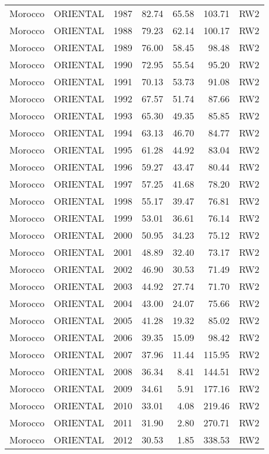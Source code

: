 \begin{longtable}{lllrrrl}
  Morocco & ORIENTAL & 1987 & 82.74 & 65.58 & 103.71 & RW2 \\ 
  Morocco & ORIENTAL & 1988 & 79.23 & 62.14 & 100.17 & RW2 \\ 
  Morocco & ORIENTAL & 1989 & 76.00 & 58.45 & 98.48 & RW2 \\ 
  Morocco & ORIENTAL & 1990 & 72.95 & 55.54 & 95.20 & RW2 \\ 
  Morocco & ORIENTAL & 1991 & 70.13 & 53.73 & 91.08 & RW2 \\ 
  Morocco & ORIENTAL & 1992 & 67.57 & 51.74 & 87.66 & RW2 \\ 
  Morocco & ORIENTAL & 1993 & 65.30 & 49.35 & 85.85 & RW2 \\ 
  Morocco & ORIENTAL & 1994 & 63.13 & 46.70 & 84.77 & RW2 \\ 
  Morocco & ORIENTAL & 1995 & 61.28 & 44.92 & 83.04 & RW2 \\ 
  Morocco & ORIENTAL & 1996 & 59.27 & 43.47 & 80.44 & RW2 \\ 
  Morocco & ORIENTAL & 1997 & 57.25 & 41.68 & 78.20 & RW2 \\ 
  Morocco & ORIENTAL & 1998 & 55.17 & 39.47 & 76.81 & RW2 \\ 
  Morocco & ORIENTAL & 1999 & 53.01 & 36.61 & 76.14 & RW2 \\ 
  Morocco & ORIENTAL & 2000 & 50.95 & 34.23 & 75.12 & RW2 \\ 
  Morocco & ORIENTAL & 2001 & 48.89 & 32.40 & 73.17 & RW2 \\ 
  Morocco & ORIENTAL & 2002 & 46.90 & 30.53 & 71.49 & RW2 \\ 
  Morocco & ORIENTAL & 2003 & 44.92 & 27.74 & 71.70 & RW2 \\ 
  Morocco & ORIENTAL & 2004 & 43.00 & 24.07 & 75.66 & RW2 \\ 
  Morocco & ORIENTAL & 2005 & 41.28 & 19.32 & 85.02 & RW2 \\ 
  Morocco & ORIENTAL & 2006 & 39.35 & 15.09 & 98.42 & RW2 \\ 
  Morocco & ORIENTAL & 2007 & 37.96 & 11.44 & 115.95 & RW2 \\ 
  Morocco & ORIENTAL & 2008 & 36.34 & 8.41 & 144.51 & RW2 \\ 
  Morocco & ORIENTAL & 2009 & 34.61 & 5.91 & 177.16 & RW2 \\ 
  Morocco & ORIENTAL & 2010 & 33.01 & 4.08 & 219.46 & RW2 \\ 
  Morocco & ORIENTAL & 2011 & 31.90 & 2.80 & 270.71 & RW2 \\ 
  Morocco & ORIENTAL & 2012 & 30.53 & 1.85 & 338.53 & RW2 \\ 

\end{longtable}

